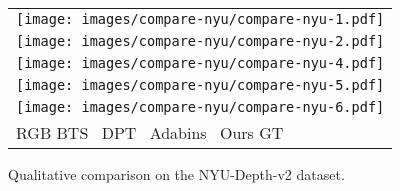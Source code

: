 \documentclass[runningheads]{llncs}
\begin{document}
\begin{figure}[b!]
    \centering
    \footnotesize
    \begin{tabular}{l}
        \texttt{[image: images/compare-nyu/compare-nyu-1.pdf]} \vspace{-0.2cm}\\
        \texttt{[image: images/compare-nyu/compare-nyu-2.pdf]} \vspace{-0.2cm}\\
\texttt{[image: images/compare-nyu/compare-nyu-4.pdf]} \vspace{-0.2cm}\\
        \texttt{[image: images/compare-nyu/compare-nyu-5.pdf]} \vspace{-0.2cm}\\
        \texttt{[image: images/compare-nyu/compare-nyu-6.pdf]} \\
        \hspace{0.055\linewidth}RGB
        \hspace{0.07\linewidth}BTS~\cite{lee2019bts}
        \hspace{0.04\linewidth}DPT~\cite{ranftl2021dpt}
        \hspace{0.03\linewidth}Adabins~\cite{bhat2021adabins}
        \hspace{0.05\linewidth}Ours
        \hspace{0.1\linewidth}GT\\
    \end{tabular}
    \caption{Qualitative comparison on the NYU-Depth-v2 dataset.}
    \label{fig::figure-nyu}
\end{figure}
\end{document}
